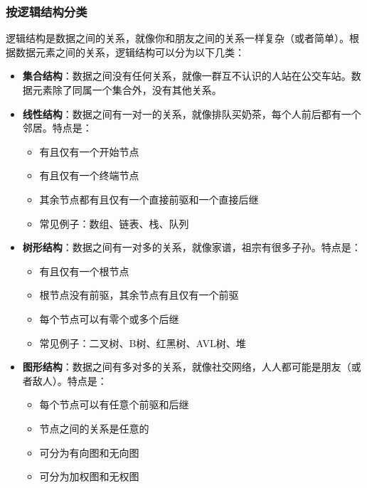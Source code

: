 \documentclass[lang=cn,newtx,10pt,scheme=chinese]{../elegantbook}
\begin{document}
\subsubsection{按逻辑结构分类}
逻辑结构是数据之间的关系，就像你和朋友之间的关系一样复杂（或者简单）。根据数据元素之间的关系，逻辑结构可以分为以下几类：
\begin{itemize}
    \item \textbf{集合结构}：数据之间没有任何关系，就像一群互不认识的人站在公交车站。数据元素除了同属一个集合外，没有其他关系。
    
    \item \textbf{线性结构}：数据之间有一对一的关系，就像排队买奶茶，每个人前后都有一个邻居。特点是：
    \begin{itemize}
        \item 有且仅有一个开始节点
        \item 有且仅有一个终端节点
        \item 其余节点都有且仅有一个直接前驱和一个直接后继
        \item 常见例子：数组、链表、栈、队列
    \end{itemize}
    
    \item \textbf{树形结构}：数据之间有一对多的关系，就像家谱，祖宗有很多子孙。特点是：
    \begin{itemize}
        \item 有且仅有一个根节点
        \item 根节点没有前驱，其余节点有且仅有一个前驱
        \item 每个节点可以有零个或多个后继
        \item 常见例子：二叉树、B树、红黑树、AVL树、堆
    \end{itemize}
    
    \item \textbf{图形结构}：数据之间有多对多的关系，就像社交网络，人人都可能是朋友（或者敌人）。特点是：
    \begin{itemize}
        \item 每个节点可以有任意个前驱和后继
        \item 节点之间的关系是任意的
        \item 可分为有向图和无向图
        \item 可分为加权图和无权图
    \end{itemize}
\end{itemize}
\end{document}
